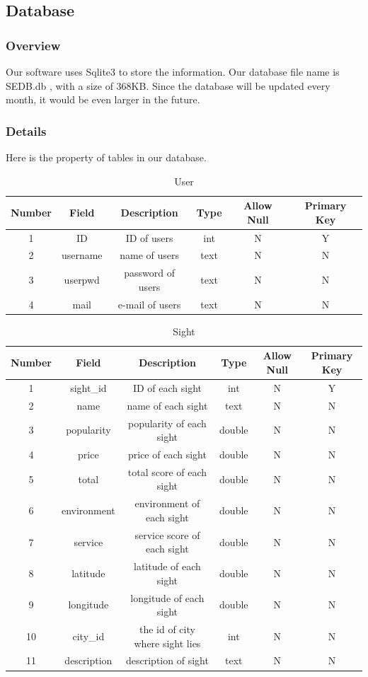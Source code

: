 \documentclass[10pt]{article}
\begin{document}
\subsection{Database}
\subsubsection{Overview}
Our software uses Sqlite3 to store the information. Our database file name is SEDB.db , with a size of 368KB. Since the database will be updated every month, it would be even larger in the future.

\subsubsection{Details}
Here is the property of tables in our database.

\begin{table}[htb]
	\centering

	\begin{tabular}{c|c|c|c|c|c}
		\hline
		Number&Field&Description&Type&Allow Null&Primary Key\\
		\hline
		1&ID&ID of users&int&N&Y\\
		\hline
		2&username&name of users&text&N&N\\
		\hline
		3&userpwd&password of users&text&N&N\\
		\hline
		4&mail&e-mail of users&text&N&N\\
		\hline
   \end{tabular}
	
	\caption{User}
\end{table}

\newpage

\begin{table}[htb]
	\centering

	\begin{tabular}{c|c|c|c|c|c}
		\hline
		Number&Field&Description&Type&Allow Null&Primary Key\\
		\hline
		1&sight\_id&ID of each sight&int&N&Y\\
		\hline
		2&name&name of each sight&text&N&N\\
		\hline
		3&popularity&popularity of each sight&double&N&N\\
		
		\hline
		4&price&price of each sight&double&N&N\\
		\hline
		5&total&total score of each sight&double&N&N\\
		\hline
		6&environment&environment of each sight&double&N&N\\
		\hline
		7&service&service score of each sight&double&N&N\\
		\hline
		8&latitude&latitude of each sight&double&N&N\\
		\hline
		9&longitude&longitude of each sight&double&N&N\\
		\hline
		10&city\_id&the id of city where sight lies&int&N&N\\
		\hline
		11&description&description of sight&text&N&N\\
		\hline
   	\end{tabular}
	\caption{Sight}
\end{table}
\end{document}
